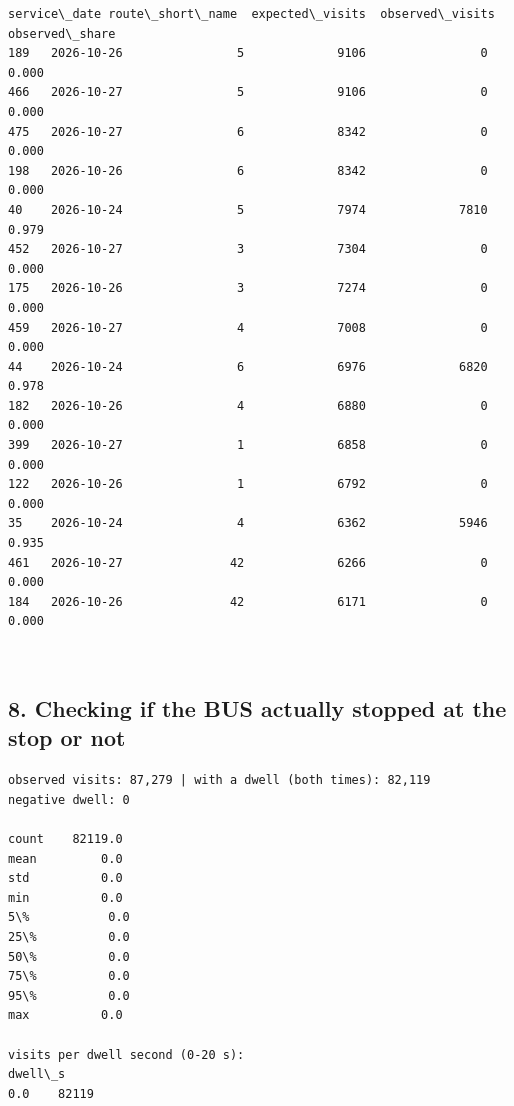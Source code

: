 \documentclass[11pt]{article}
\begin{document}
    
    
    \begin{Verbatim}[commandchars=\\\{\}]
    service\_date route\_short\_name  expected\_visits  observed\_visits  observed\_share
189   2026-10-26                5             9106                0           0.000
466   2026-10-27                5             9106                0           0.000
475   2026-10-27                6             8342                0           0.000
198   2026-10-26                6             8342                0           0.000
40    2026-10-24                5             7974             7810           0.979
452   2026-10-27                3             7304                0           0.000
175   2026-10-26                3             7274                0           0.000
459   2026-10-27                4             7008                0           0.000
44    2026-10-24                6             6976             6820           0.978
182   2026-10-26                4             6880                0           0.000
399   2026-10-27                1             6858                0           0.000
122   2026-10-26                1             6792                0           0.000
35    2026-10-24                4             6362             5946           0.935
461   2026-10-27               42             6266                0           0.000
184   2026-10-26               42             6171                0           0.000
    \end{Verbatim}

    
    \begin{center}
    \end{center}
    { \hspace*{\fill} \\}
    
    \subsection{8. Checking if the BUS actually stopped at the stop or
not}\label{checking-if-the-bus-actually-stopped-at-the-stop-or-not}

    \begin{Verbatim}[commandchars=\\\{\}]
observed visits: 87,279 | with a dwell (both times): 82,119
negative dwell: 0

count    82119.0
mean         0.0
std          0.0
min          0.0
5\%           0.0
25\%          0.0
50\%          0.0
75\%          0.0
95\%          0.0
max          0.0

visits per dwell second (0-20 s):
dwell\_s
0.0    82119
    \end{Verbatim}
\end{document}
